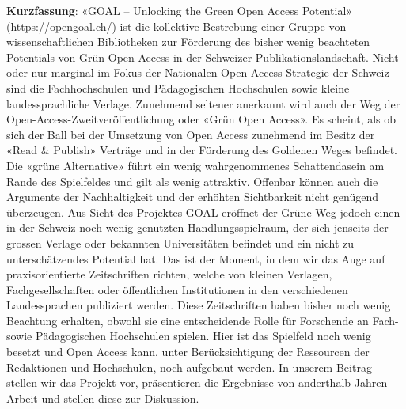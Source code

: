 \textbf{Kurzfassung}: «GOAL -- Unlocking the Green Open Access
Potential» (\url{https://opengoal.ch/}) ist die kollektive Bestrebung
einer Gruppe von wissenschaftlichen Bibliotheken zur Förderung des
bisher wenig beachteten Potentials von Grün Open Access in der Schweizer
Publikationslandschaft. Nicht oder nur marginal im Fokus der Nationalen
Open-Access-Strategie der Schweiz sind die Fachhochschulen und
Pädagogischen Hochschulen sowie kleine landessprachliche Verlage.
Zunehmend seltener anerkannt wird auch der Weg der
Open-Access-Zweitveröffentlichung oder «Grün Open Access». Es scheint,
als ob sich der Ball bei der Umsetzung von Open Access zunehmend im
Besitz der «Read \& Publish» Verträge und in der Förderung des Goldenen
Weges befindet. Die «grüne Alternative» führt ein wenig wahrgenommenes
Schattendasein am Rande des Spielfeldes und gilt als wenig attraktiv.
Offenbar können auch die Argumente der Nachhaltigkeit und der erhöhten
Sichtbarkeit nicht genügend überzeugen. Aus Sicht des Projektes GOAL
eröffnet der Grüne Weg jedoch einen in der Schweiz noch wenig genutzten
Handlungsspielraum, der sich jenseits der grossen Verlage oder bekannten
Universitäten befindet und ein nicht zu unterschätzendes Potential hat.
Das ist der Moment, in dem wir das Auge auf praxisorientierte
Zeitschriften richten, welche von kleinen Verlagen, Fachgesellschaften
oder öffentlichen Institutionen in den verschiedenen Landessprachen
publiziert werden. Diese Zeitschriften haben bisher noch wenig Beachtung
erhalten, obwohl sie eine entscheidende Rolle für Forschende an Fach-
sowie Pädagogischen Hochschulen spielen. Hier ist das Spielfeld noch
wenig besetzt und Open Access kann, unter Berücksichtigung der
Ressourcen der Redaktionen und Hochschulen, noch aufgebaut werden. In
unserem Beitrag stellen wir das Projekt vor, präsentieren die Ergebnisse
von anderthalb Jahren Arbeit und stellen diese zur Diskussion.

